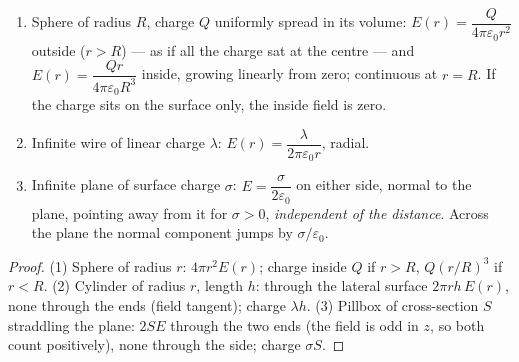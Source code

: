 \begin{proposition}\label{prop:b1:electrostatics-gauss:three}
\begin{enumerate}
  \item Sphere of radius $R$, charge $Q$ uniformly spread in its
        volume: $E(r) = \dfrac{Q}{4\pi\varepsilon_0r^2}$ outside ($r > R$) ---
        as if all the charge sat at the centre --- and $E(r) =
        \dfrac{Qr}{4\pi\varepsilon_0R^3}$ inside, growing linearly from zero;
        continuous at $r = R$. If the charge sits on the surface only,
        the inside field is zero.
  \item Infinite wire of linear charge $\lambda$: $E(r) =
        \dfrac{\lambda}{2\pi\varepsilon_0 r}$, radial.
  \item Infinite plane of surface charge $\sigma$: $E = \dfrac{\sigma}{2\varepsilon_0}$
        on either side, normal to the plane, pointing away from it for
        $\sigma > 0$, \emph{independent of the distance}. Across the plane
        the normal component jumps by $\sigma/\varepsilon_0$.
\end{enumerate}
\end{proposition}

\begin{proof}
(1) Sphere of radius $r$:  $4\pi r^2E(r)$; charge inside $Q$ if
$r > R$, $Q(r/R)^3$ if $r < R$. (2) Cylinder of radius $r$, length $h$:
 through the lateral surface $2\pi rh\,E(r)$, none through the ends
(field tangent); charge $\lambda h$. (3) Pillbox of cross-section $S$
straddling the plane:  $2SE$ through the two ends (the field is odd
in $z$, so both count positively), none through the side; charge
$\sigma S$.
\end{proof}

